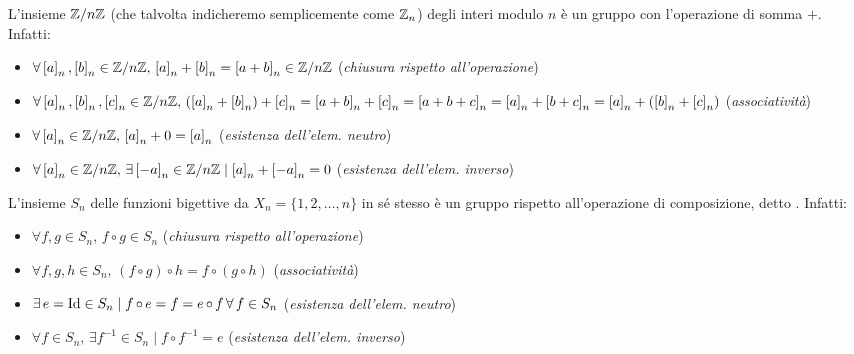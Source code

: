 \begin{example}
    L'insieme $\mathbb Z/n\mathbb Z$ (che talvolta indicheremo semplicemente come $\mathbb Z_n$) degli interi modulo $n$ è un gruppo con l'operazione di
    somma $+$. Infatti:

    \begin{itemize}
        \item $\forall \left[a\right]_n, \left[b\right]_n \in \ZZ/n\ZZ, \, \left[a\right]_n + \left[b\right]_n = \left[a+b\right]_n \in \ZZ/n\ZZ$ (\textit{chiusura rispetto all'operazione})
        \item $\forall \left[a\right]_n, \left[b\right]_n, \left[c\right]_n \in \ZZ/n\ZZ, \, \left(\left[a\right]_n + \left[b\right]_n\right) + \left[c\right]_n = \left[a+b\right]_n +
        \left[c\right]_n = \left[a+b+c\right]_n = \left[a\right]_n + \left[b+c\right]_n = \left[a\right]_n + \left(\left[b\right]_n + \left[c\right]_n\right)$ (\textit{associatività})
        \item $\forall \left[a\right]_n \in \ZZ/n\ZZ, \, \left[a\right]_n + 0 = \left[a\right]_n$ (\textit{esistenza dell'elem. neutro})
        \item $\forall \left[a\right]_n \in \ZZ/n\ZZ, \, \exists \left[-a\right]_n \in \ZZ/n\ZZ \mid \left[a\right]_n + \left[-a\right]_n = 0$ (\textit{esistenza dell'elem. inverso})
    \end{itemize}
\end{example}

\begin{example}
    L'insieme $S_n$ delle funzioni bigettive da $X_n = \{1, 2, \ldots, n\}$ in sé stesso è un
    gruppo rispetto all'operazione di composizione, detto . Infatti:

    \begin{itemize}
        \item $\forall f, g \in S_n, \, f \circ g \in S_n$ (\textit{chiusura rispetto all'operazione})
        \item $\forall f, g, h \in S_n, \, (f \circ g) \circ h = f \circ (g \circ h)$ (\textit{associatività})
        \item $\exists e = \Id \in S_n \mid f \circ e = f = e \circ f \forall f \in S_n$ (\textit{esistenza dell'elem. neutro})
        \item $\forall f \in S_n, \, \exists f^{-1} \in S_n \mid f \circ f^{-1} = e$ (\textit{esistenza dell'elem. inverso})
    \end{itemize}
\end{example}

